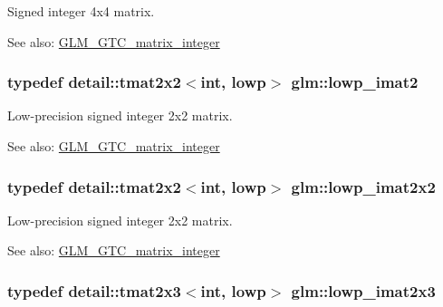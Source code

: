 Signed integer 4x4 matrix. \begin{Desc}
\item[See also:]\hyperlink{group__gtc__matrix__integer}{GLM\_\-GTC\_\-matrix\_\-integer} \end{Desc}
\hypertarget{group__gtc__matrix__integer_ge0df4bc278c1a958a32af9ac82c47630}{
\subsubsection[lowp\_\-imat2]{\setlength{\rightskip}{0pt plus 5cm}typedef detail::tmat2x2$<$int, lowp$>$ {\bf glm::lowp\_\-imat2}}}
\label{group__gtc__matrix__integer_ge0df4bc278c1a958a32af9ac82c47630}


Low-precision signed integer 2x2 matrix. \begin{Desc}
\item[See also:]\hyperlink{group__gtc__matrix__integer}{GLM\_\-GTC\_\-matrix\_\-integer} \end{Desc}
\hypertarget{group__gtc__matrix__integer_g05307630bc68a62132a82d1886a0b5e2}{
\subsubsection[lowp\_\-imat2x2]{\setlength{\rightskip}{0pt plus 5cm}typedef detail::tmat2x2$<$int, lowp$>$ {\bf glm::lowp\_\-imat2x2}}}
\label{group__gtc__matrix__integer_g05307630bc68a62132a82d1886a0b5e2}


Low-precision signed integer 2x2 matrix. \begin{Desc}
\item[See also:]\hyperlink{group__gtc__matrix__integer}{GLM\_\-GTC\_\-matrix\_\-integer} \end{Desc}
\hypertarget{group__gtc__matrix__integer_g5757953c508a6e05bf3573d6c099cf88}{
\subsubsection[lowp\_\-imat2x3]{\setlength{\rightskip}{0pt plus 5cm}typedef detail::tmat2x3$<$int, lowp$>$ {\bf glm::lowp\_\-imat2x3}}}
\label{group__gtc__matrix__integer_g5757953c508a6e05bf3573d6c099cf88}


